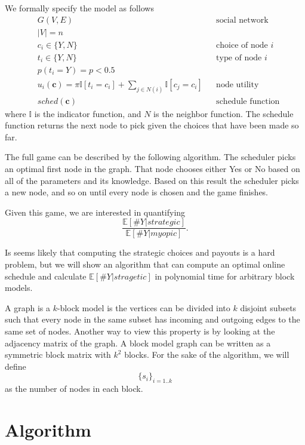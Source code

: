 \documentclass{article}
\begin{document}
We formally specify the model as follows
\begin{align*}
  & G(V,E) && \text{social network} \\
  & |V| = n \\
  & c_i \in \{Y,N\} && \text{choice of node $i$} \\
  & t_i \in \{Y, N\} && \text{type of node $i$} \\
  & p(t_i = Y) = p < 0.5 \\
  & u_i(\mathbf c) = \pi \mathbb I[t_i = c_i] + \sum_{j \in N(i)}
  \mathbb I[c_j = c_i] && \text{node utility} \\
  & sched(\mathbf c) && \text{schedule function}
\end{align*}
where $\mathbb I$ is the indicator function, and $N$ is the neighbor
function. The schedule function returns the next node to pick given
the choices that have been made so far.

The full game can be described by the following algorithm. The
scheduler picks an optimal first node in the graph. That node chooses
either Yes or No based on all of the parameters and its
knowledge. Based on this result the scheduler picks a new node, and so
on until every node is chosen and the game finishes.

Given this game, we are interested in quantifying
\begin{equation*}
  \frac{\mathbb E[\#Y|strategic]}{\mathbb E[\#Y|myopic]}.
\end{equation*}

Is seems likely that computing the strategic choices and payouts is a
hard problem, but we will show an algorithm that can compute an
optimal online schedule and calculate $\mathbb E[\#Y|stragetic]$ in
polynomial time for arbitrary block models.

A graph is a $k$-block model is the vertices can be divided into $k$
disjoint subsets such that every node in the same subset has
incoming and outgoing edges to the same set of nodes. Another way to
view this property is by looking at the adjacency matrix of the
graph. A block model graph can be written as a symmetric block matrix
with $k^2$ blocks. For the sake of the algorithm, we will define
\begin{equation*}
  \{s_i\}_{i=1..k}
\end{equation*}
as the number of nodes in each block.

\section{Algorithm}
\label{sec:algorithm}
\end{document}
